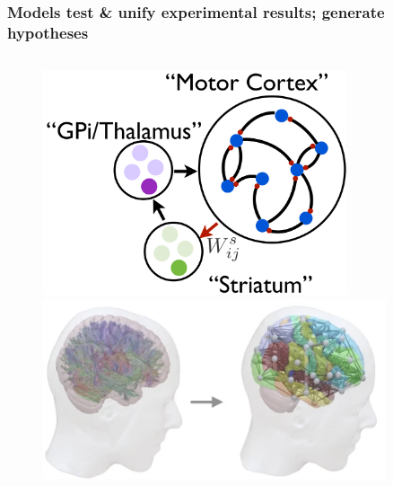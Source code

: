 \begin{frame}[c]
  \frametitle{Models test \& unify experimental results; generate hypotheses}
  \begin{columns}
    \begin{column}{0.5\textwidth}
      \begin{figure}[h]
        \centering
        \includegraphics[width=0.8\textwidth]{99_images/Murray2019-4b}\\\vspace{0.2cm}
        \includegraphics[width=0.9\textwidth]{99_images/TVB}\\
      \end{figure}%
    \end{column}
\end{columns}
\end{frame}
